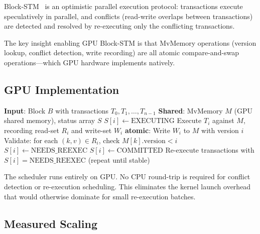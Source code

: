 \documentclass[11pt]{article}
\begin{document}
Block-STM~\cite{blockstm} is an optimistic parallel execution protocol: transactions
execute speculatively in parallel, and conflicts (read-write overlaps between transactions)
are detected and resolved by re-executing only the conflicting transactions.

The key insight enabling GPU Block-STM is that MvMemory operations (version lookup,
conflict detection, write recording) are all atomic compare-and-swap operations---which
GPU hardware implements natively.

\subsection{GPU Implementation}

\begin{algorithm}[h]
\caption{GPU Block-STM (simplified)}
\begin{algorithmic}[1]
\State \textbf{Input}: Block $B$ with transactions $T_0, T_1, \ldots, T_{n-1}$
\State \textbf{Shared}: MvMemory $M$ (GPU shared memory), status array $S$
    \State $S[i] \gets \text{EXECUTING}$
    \State Execute $T_i$ against $M$, recording read-set $R_i$ and write-set $W_i$
    \State \textbf{atomic}: Write $W_i$ to $M$ with version $i$
    \State Validate: for each $(k,v) \in R_i$, check $M[k].\text{version} < i$
        \State $S[i] \gets \text{NEEDS\_REEXEC}$
    \Else
        \State $S[i] \gets \text{COMMITTED}$
    \EndIf
\EndFor
\State Re-execute transactions with $S[i] = \text{NEEDS\_REEXEC}$ (repeat until stable)
\end{algorithmic}
\end{algorithm}

The scheduler runs entirely on GPU. No CPU round-trip is required for conflict detection
or re-execution scheduling. This eliminates the kernel launch overhead that would otherwise
dominate for small re-execution batches.

\subsection{Measured Scaling}
\end{document}
